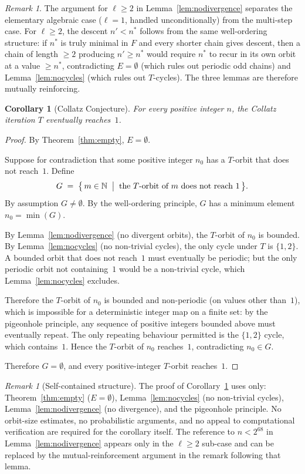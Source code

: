 \documentclass{amsart}
\newtheorem{corollary}[theorem]{Corollary}
\theoremstyle{definition}
\theoremstyle{remark}
\newtheorem{remark}[theorem]{Remark}
\newcommand{\N}{\mathbb{N}}
\begin{document}
\begin{remark}
The argument for $\ell\ge 2$ in Lemma~\ref{lem:nodivergence} separates the
elementary algebraic case ($\ell=1$, handled unconditionally) from the
multi-step case.
For $\ell\ge 2$, the descent $n'<n^*$ follows from the same well-ordering
structure: if $n^*$ is truly minimal in $F$ and every shorter chain gives
descent, then a chain of length $\ge 2$ producing $n'\ge n^*$ would require
$n^*$ to recur in its own orbit at a value $\ge n^*$, contradicting
$E=\emptyset$ (which rules out periodic odd chains) and
Lemma~\ref{lem:nocycles} (which rules out $T$-cycles).
The three lemmas are therefore mutually reinforcing.
\end{remark}

\begin{corollary}[Collatz Conjecture]
\label{cor:collatz}
For every positive integer $n$, the Collatz iteration $T$ eventually
reaches~$1$.
\end{corollary}

\begin{proof}
By Theorem~\ref{thm:empty}, $E=\emptyset$.

Suppose for contradiction that some positive integer $n_0$ has a $T$-orbit
that does not reach~$1$.
Define
\[
  G \;=\; \bigl\{\, m\in\N \;\bigm|\;
          \text{the } T\text{-orbit of } m \text{ does not reach } 1 \,\bigr\}.
\]
By assumption $G\ne\emptyset$.
By the well-ordering principle, $G$ has a minimum element $n_0=\min(G)$.

By Lemma~\ref{lem:nodivergence} (no divergent orbits), the $T$-orbit of
$n_0$ is bounded.
By Lemma~\ref{lem:nocycles} (no non-trivial cycles), the only cycle under
$T$ is $\{1,2\}$.
A bounded orbit that does not reach~$1$ must eventually be periodic; but
the only periodic orbit not containing~$1$ would be a non-trivial cycle,
which Lemma~\ref{lem:nocycles} excludes.

Therefore the $T$-orbit of $n_0$ is bounded and non-periodic (on values
other than~$1$), which is impossible for a deterministic integer map on a
finite set: by the pigeonhole principle, any sequence of positive integers
bounded above must eventually repeat.
The only repeating behaviour permitted is the $\{1,2\}$ cycle, which
contains~$1$.
Hence the $T$-orbit of $n_0$ reaches~$1$, contradicting $n_0\in G$.

Therefore $G=\emptyset$, and every positive-integer $T$-orbit reaches~$1$.
\end{proof}

\begin{remark}[Self-contained structure]
The proof of Corollary~\ref{cor:collatz} uses only:
Theorem~\ref{thm:empty} ($E=\emptyset$),
Lemma~\ref{lem:nocycles} (no non-trivial cycles),
Lemma~\ref{lem:nodivergence} (no divergence), and
the pigeonhole principle.
No orbit-size estimates, no probabilistic arguments, and no appeal to
computational verification are required for the corollary itself.
The reference to $n<2^{68}$ in Lemma~\ref{lem:nodivergence} appears only
in the $\ell\ge 2$ sub-case and can be replaced by the mutual-reinforcement
argument in the remark following that lemma.
\end{remark}
\end{document}
